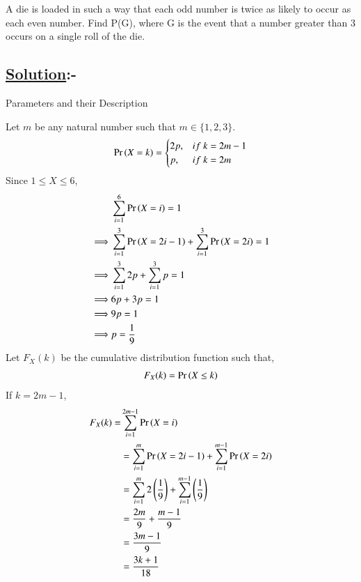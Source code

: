 \documentclass[journal,12pt,twocolumn]{IEEEtran}
\begin{document}
A die is loaded in such a way that each odd number is twice as likely to occur as
each even number. Find P(G), where G is the event that a number greater than
3 occurs on a single roll of the die.

\subsection*{\textbf{\underline{Solution}:-}}

\begin{table}[h]

\label{tab:parameters}
\caption{Parameters and their Description}
\end{table}

Let $m$ be any natural number such that $m\in\{1,2,3\}$.\\ 
\begin{align}
\Pr\left(X=k\right)= \begin{cases} 
      2p, & if\ k=2m-1 \\
      p, & if\ k=2m 
   \end{cases}
\end{align}
Since $1\leq X \leq6$,
\begin{align}
&\sum_{i=1}^{6}{\Pr\left(X=i\right)} = 1\\
\implies &\sum_{i=1}^{3}{\Pr\left(X=2i-1\right)} + \sum_{i=1}^{3}{\Pr\left(X=2i\right)} = 1\\
\implies &\sum_{i=1}^{3}{2p} + \sum_{i=1}^{3}{p} = 1\\
\implies &6p+3p = 1\\
\implies &9p = 1\\
\implies &p = \frac{1}{9}
\end{align}
Let $F_X (k)$ be the cumulative distribution function such that,\\
\begin{align}
    F_X (k) = \Pr\left(X\leq k\right)
\end{align}
If $k = 2m-1$,
\begin{align}
    F_X (k) = &\sum_{i=1}^{2m-1}{\Pr\left(X=i\right)}
\\
    &= \sum_{i=1}^{m}{\Pr\left(X=2i-1\right)} + \sum_{i=1}^{m-1}{\Pr\left(X=2i\right)}\\
    &= \sum_{i=1}^{m}{2\left(\frac{1}{9}\right)} + \sum_{i=1}^{m-1}{\left(\frac{1}{9}\right)}\\
    &= \frac{2m}{9} + \frac{m-1}{9}\\
    &= \frac{3m-1}{9}\\
    &= \frac{3k+1}{18}
\end{align}
\end{document}
